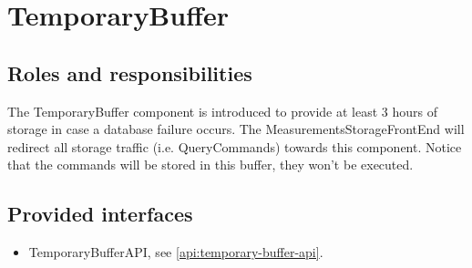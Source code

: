 \section{TemporaryBuffer}
\label{element:temporary-buffer}

\subsection{Roles and responsibilities}

\npar The TemporaryBuffer component is introduced to provide at least 3 hours of
storage in case a database failure occurs. The MeasurementsStorageFrontEnd will redirect
all storage traffic (i.e. QueryCommands) towards this component. Notice that the
commands will be stored in this buffer, they won't be executed.

\subsection{Provided interfaces}

\begin{itemize}
  \item TemporaryBufferAPI, see \ref{api:temporary-buffer-api}.
\end{itemize}